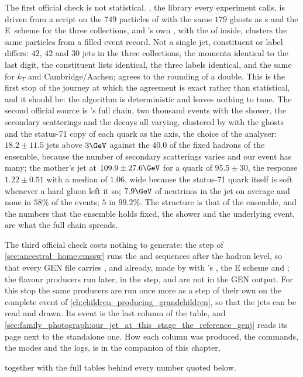 The first official check is not statistical. \FASTJET, the library every
experiment calls, is driven from a script on the $749$ particles of
 with the same $179$ ghosts as s and
the E~scheme for the three collections, and \PYTHIA's own ,
with the  of \FASTJET inside, clusters the same particles
from a filled event record. Not a single jet, constituent or label
differs: $42$, $42$ and $30$ jets in the three collections, the momenta
identical to the last digit, the constituent lists identical, the three
labels identical, and the same for $k_T$ and Cambridge/Aachen; 
agrees to the rounding of a double. This is the first stop of the journey
at which the agreement is exact rather than statistical, and it should
be: the algorithm is deterministic and leaves nothing to tune. The second
official source is \PYTHIA's full chain, two thousand events with the
shower, the secondary scatterings and the decays all varying, clustered
by \FASTJET with the ghosts and the status-71 copy of each quark as the
axis, the choice of the \CMSSW analyser: $18.2\pm11.5$ \akfour jets above
$3\GeV$ against the $40.0$ of the fixed hadrons of the ensemble, because
the number of secondary scatterings varies and our event has many; the
mother's jet at $109.9\pm27.6\GeV$ for a quark of $95.5\pm30$, the
response $1.22\pm0.51$ with a median of $1.06$, wide because the
status-71 quark itself is soft whenever a hard gluon left it so;
$7.9\GeV$ of neutrinos in the jet on average and none in $58\%$ of the
events; \hadflav $5$ in $99.2\%$. The structure is that of the ensemble,
and the numbers that the ensemble holds fixed, the shower and the
underlying event, are what the full chain spreads.
\label{sec:family_photograph:cmssw}

The third official check costs nothing to generate: the  step of
\cref{sec:ancestral_home:cmssw} runs the  and
 sequences after the hadron level, so that every GEN
file carries \akfour, \akfournonu and \akeight already, made by
 with \FASTJET's \antikt, the E scheme and
; the flavour producers run later, in the 
step, and are not in the GEN output. For this stop the same producers are
run once more as a step of their own on the complete event of
\cref{ch:children_producing_grandchildren}, so that the jets can be read
and drawn. Its event is the last column of the table, and
\cref{sec:family_photograph:our_jet_at_this_stage_the_reference_genj} reads
its \akfour page next to the standalone one. How each column was
produced, the commands, the modes and the logs, is in the companion of
this chapter,
\begin{center}
\end{center}
together with the full tables behind every number quoted below.

